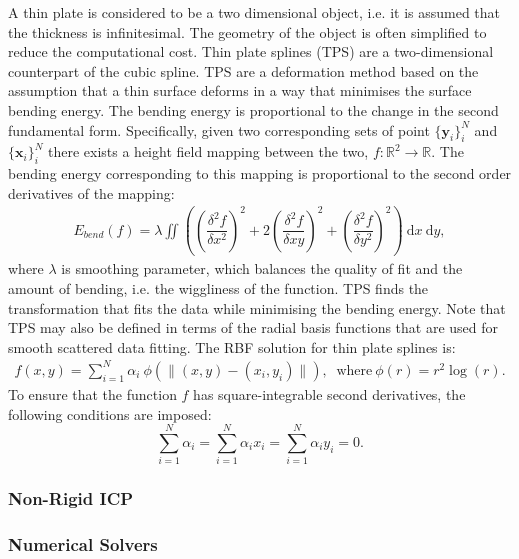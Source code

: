\documentclass[11pt]{article}
\newcommand{\x}{\mathbf{x}}
\newcommand{\y}{\mathbf{y}}
\newcommand{\dd}{\: \mathrm{d}}
\begin{document}
A thin plate is considered to be a two dimensional object, i.e. it is assumed that the thickness is infinitesimal. The geometry of the object is often simplified to reduce the computational cost. Thin plate splines (TPS) are a two-dimensional counterpart of the cubic spline. TPS are a deformation method based on the assumption that a thin surface deforms in a way that minimises the surface bending energy. The bending energy is proportional to the change in the second fundamental form. Specifically, given two corresponding sets of point $\{\y_i\}_i^N$ and $\{\x_i\}_i^N$ there exists a height field mapping between the two, $f: \mathbb{R}^2 \to \mathbb{R}$. The bending energy corresponding to this mapping is proportional to the second order derivatives of the mapping:
\begin{equation}
\begin{aligned}
	E_{bend}(f) = \lambda \iint \left( \left( \dfrac{\delta^2f}{\delta x^2} \right)^2 +  2 \left( \dfrac{\delta^2f}{\delta x y} \right)^2 +  \left( \dfrac{\delta^2f}{\delta y^2} \right)^2 \right) \dd x \dd y,
\end{aligned}
\end{equation} where $\lambda$ is smoothing parameter, which balances the quality of fit and the amount of bending, i.e. the wiggliness of the function. TPS finds the transformation that fits the data while minimising the bending energy. Note that TPS may also be defined in terms of the radial basis functions that are used for smooth scattered data fitting. The RBF solution for thin plate splines is:
\begin{equation}
\begin{aligned}
	f(x,y) = \sum_{i=1}^N \alpha_i \: \phi(\|(x,y) - (x_i,y_i)\|), \: \text{ where} \: \phi(r) = r^2 \log(r).
\end{aligned}
\end{equation} To ensure that the function $f$ has square-integrable second derivatives, the following conditions are imposed:
\begin{equation}
	\sum_{i=1}^N \alpha_i = \sum_{i=1}^N \alpha_i x_i = \sum_{i=1}^N \alpha_i y_i = 0.
\end{equation}

\subsubsection{Non-Rigid ICP}


\subsubsection{Numerical Solvers}
\end{document}
